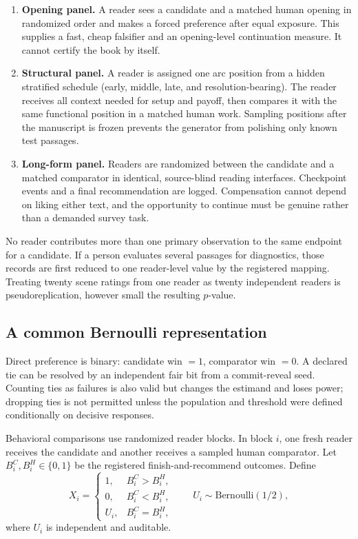 \documentclass[11pt]{article}
\theoremstyle{remark}
\begin{document}
\begin{enumerate}
  \item \textbf{Opening panel.} A reader sees a candidate and a matched human opening in
  randomized order and makes a forced preference after equal exposure. This supplies a
  fast, cheap falsifier and an opening-level continuation measure. It cannot certify the
  book by itself.
  \item \textbf{Structural panel.} A reader is assigned one arc position from a hidden
  stratified schedule (early, middle, late, and resolution-bearing). The reader receives all
  context needed for setup and payoff, then compares it with the same functional position in
  a matched human work. Sampling positions after the manuscript is frozen prevents the
  generator from polishing only known test passages.
  \item \textbf{Long-form panel.} Readers are randomized between the candidate and a matched
  comparator in identical, source-blind reading interfaces. Checkpoint events and a final
  recommendation are logged. Compensation cannot depend on liking either text, and the
  opportunity to continue must be genuine rather than a demanded survey task.
\end{enumerate}

No reader contributes more than one primary observation to the same endpoint for a candidate.
If a person evaluates several passages for diagnostics, those records are first reduced to
one reader-level value by the registered mapping. Treating twenty scene ratings from one
reader as twenty independent readers is pseudoreplication, however small the resulting
$p$-value.

\subsection{A common Bernoulli representation}

Direct preference is binary: candidate win $=1$, comparator win $=0$. A declared tie can be
resolved by an independent fair bit from a commit-reveal seed. Counting ties as failures is
also valid but changes the estimand and loses power; dropping ties is not permitted unless
the population and threshold were defined conditionally on decisive responses.

Behavioral comparisons use randomized reader blocks. In block $i$, one fresh reader receives
the candidate and another receives a sampled human comparator. Let $B_i^C,B_i^H\in\{0,1\}$
be the registered finish-and-recommend outcomes. Define
\[
 X_i =
 \begin{cases}
  1,&B_i^C>B_i^H,\\
  0,&B_i^C<B_i^H,\\
  U_i,&B_i^C=B_i^H,
 \end{cases}
 \qquad U_i\sim\mathrm{Bernoulli}(1/2),
\]
where $U_i$ is independent and auditable.
\end{document}
